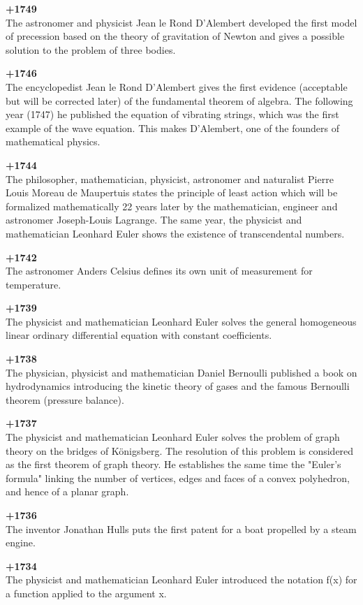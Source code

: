\textbf{+1749}\\
The astronomer and physicist Jean le Rond D'Alembert developed the first model of precession based on the theory of gravitation of Newton and gives a possible solution to the problem of three bodies.

\textbf{+1746}\\
The encyclopedist Jean le Rond D'Alembert gives the first evidence (acceptable but will be corrected later) of the fundamental theorem of algebra. The following year (1747) he published the equation of vibrating strings, which was the first example of the wave equation. This makes D'Alembert, one of the founders of mathematical physics.

\textbf{+1744}\\
The philosopher, mathematician, physicist, astronomer and naturalist Pierre Louis Moreau de Maupertuis states the principle of least action which will be formalized mathematically 22 years later by the mathematician, engineer and astronomer Joseph-Louis Lagrange. The same year, the physicist and mathematician Leonhard Euler shows the existence of transcendental numbers.

\textbf{+1742}\\
The astronomer Anders Celsius defines its own unit of measurement for temperature.

\textbf{+1739}\\
The physicist and mathematician Leonhard Euler solves the general homogeneous linear ordinary differential equation with constant coefficients.

\textbf{+1738}\\
The physician, physicist and mathematician Daniel Bernoulli published a book on hydrodynamics introducing the kinetic theory of gases and the famous Bernoulli theorem (pressure balance).

\textbf{+1737}\\
The physicist and mathematician Leonhard Euler solves the problem of graph theory on the bridges of Königsberg. The resolution of this problem is considered as the first theorem of graph theory. He establishes the same time the "Euler's formula" linking the number of vertices, edges and faces of a convex polyhedron, and hence of a planar graph.

\textbf{+1736}\\
The inventor Jonathan Hulls puts the first patent for a boat propelled by a steam engine.

\textbf{+1734}\\
The physicist and mathematician Leonhard Euler introduced the notation f(x) for a function applied to the argument x.

